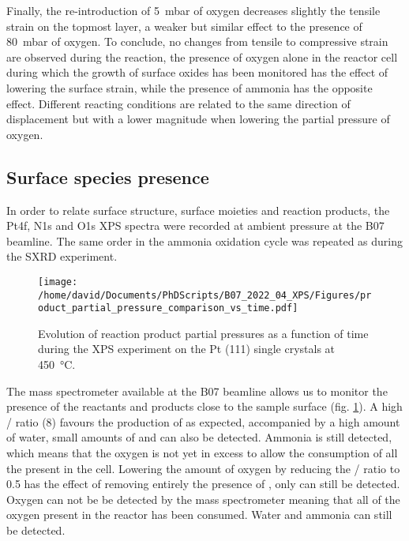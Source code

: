 Finally, the re-introduction of \qty{5}{\milli\bar} of oxygen decreases slightly the tensile strain on the topmost layer, a weaker but similar effect to the presence of \qty{80}{\milli\bar} of oxygen.
To conclude, no changes from tensile to compressive strain are observed during the reaction, the presence of oxygen alone in the reactor cell during which the growth of surface oxides has been monitored has the effect of lowering the surface strain, while the presence of ammonia has the opposite effect.
Different reacting conditions are related to the same direction of displacement but with a lower magnitude when lowering the partial pressure of oxygen.

\subsection{Surface species presence}

In order to relate surface structure, surface moieties and reaction products, the Pt4f, N1s and O1s XPS spectra were recorded at ambient pressure at the B07 beamline.
The same order in the ammonia oxidation cycle was repeated as during the SXRD experiment.

\begin{figure}[!htb]
    \centering
    \texttt{[image: /home/david/Documents/PhDScripts/B07\_2022\_04\_XPS/Figures/product\_partial\_pressure\_comparison\_vs\_time.pdf]}
    \caption{
        Evolution of reaction product partial pressures as a function of time during the XPS experiment on the Pt (111) single crystals at \qty{450}{\degreeCelsius}.
    }
    \label{fig:XPS111RGA}
\end{figure}

The mass spectrometer available at the B07 beamline allows us to monitor the presence of the reactants and products close to the sample surface (fig. \ref{fig:XPS111RGA}).
A high / ratio (8) favours the production of  as expected, accompanied by a high amount of water, small amounts of  and  can also be detected.
Ammonia is still detected, which means that the oxygen is not yet in excess to allow the consumption of all the  present in the cell.
Lowering the amount of oxygen by reducing the / ratio to 0.5 has the effect of removing entirely the presence of , only  can still be detected.
Oxygen can not be be detected by the mass spectrometer meaning that all of the oxygen present in the reactor has been consumed.
Water and ammonia can still be detected.

